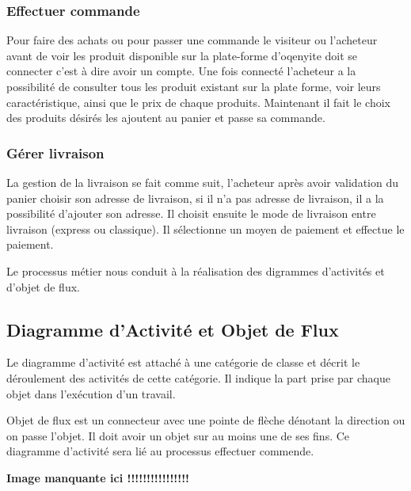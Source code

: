 \subsubsection*{Effectuer commande}
Pour faire des achats ou pour passer une commande le visiteur ou l'acheteur avant de voir les produit disponible sur la plate-forme d'oqenyite doit se connecter c'est à dire avoir un compte. Une fois connecté l'acheteur a la possibilité de consulter tous les produit existant sur la plate forme, voir leurs caractéristique, ainsi que le prix de chaque produits. Maintenant il fait le choix des produits désirés les ajoutent au panier et passe sa commande.



\subsubsection*{Gérer livraison}
La gestion de la livraison se fait comme suit, l'acheteur après avoir validation du panier choisir son adresse de livraison, si il n'a pas adresse de livraison, il a la possibilité d'ajouter son adresse. Il choisit ensuite le mode de livraison entre livraison (express ou classique). Il sélectionne un moyen de paiement et effectue le paiement.

Le processus métier nous conduit à la réalisation des digrammes d'activités et d'objet de flux.


\subsection{Diagramme d'Activité et Objet de Flux}

Le diagramme d’activité est attaché à une catégorie de classe et décrit le déroulement des activités de cette catégorie. Il indique la part prise par chaque objet dans
l’exécution d’un travail.

Objet de flux est un connecteur avec une pointe de flèche dénotant la direction ou on passe l’objet. Il doit avoir un objet sur au moins une de ses fins. 
Ce diagramme d'activité sera lié au processus effectuer commende.

\textbf{Image manquante ici !!!!!!!!!!!!!!!!}


